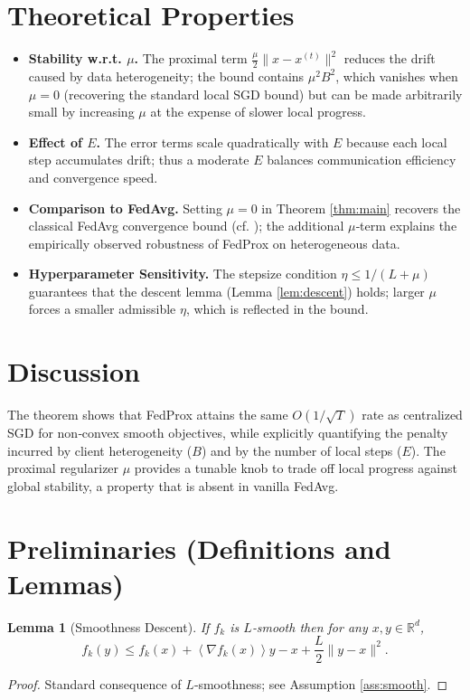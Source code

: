 \documentclass[11pt]{article}
\newtheorem{lemma}{Lemma}
\newcommand{\R}{\mathbb{R}}
\newcommand{\inner}[1]{\left\langle #1 \right\rangle}
\begin{document}
\section*{Theoretical Properties}
\begin{itemize}[noitemsep]
\item \textbf{Stability w.r.t. $\mu$.} The proximal term $\frac{\mu}{2}\|x-x^{(t)}\|^{2}$ reduces the drift caused by data heterogeneity; the bound contains $\mu^{2}B^{2}$, which vanishes when $\mu=0$ (recovering the standard local SGD bound) but can be made arbitrarily small by increasing $\mu$ at the expense of slower local progress.
\item \textbf{Effect of $E$.} The error terms scale quadratically with $E$ because each local step accumulates drift; thus a moderate $E$ balances communication efficiency and convergence speed.
\item \textbf{Comparison to FedAvg.} Setting $\mu=0$ in Theorem \ref{thm:main} recovers the classical FedAvg convergence bound (cf. \cite{li2020federated}); the additional $\mu$‑term explains the empirically observed robustness of FedProx on heterogeneous data.
\item \textbf{Hyperparameter Sensitivity.} The stepsize condition $\eta\le 1/(L+\mu)$ guarantees that the descent lemma (Lemma \ref{lem:descent}) holds; larger $\mu$ forces a smaller admissible $\eta$, which is reflected in the bound.
\end{itemize}

\section*{Discussion}
The theorem shows that FedProx attains the same $O(1/\sqrt{T})$ rate as centralized SGD for non‑convex smooth objectives, while explicitly quantifying the penalty incurred by client heterogeneity ($B$) and by the number of local steps ($E$). The proximal regularizer $\mu$ provides a tunable knob to trade off local progress against global stability, a property that is absent in vanilla FedAvg.

\newpage

\section*{Preliminaries (Definitions and Lemmas)}
\begin{lemma}[Smoothness Descent]\label{lem:smooth}
If $f_k$ is $L$‑smooth then for any $x,y\in\R^{d}$,
\[
f_k(y)\le f_k(x)+\inner{\nabla f_k(x)}{y-x}+\frac{L}{2}\|y-x\|^{2}.
\]
\end{lemma}
\begin{proof}
Standard consequence of $L$‑smoothness; see Assumption \ref{ass:smooth}. \qedhere
\end{proof}
\end{document}
